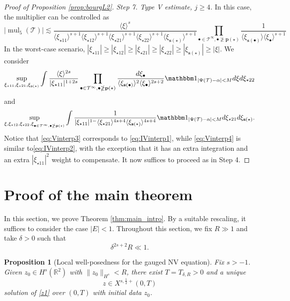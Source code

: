 \documentclass[a4paper,
11pt,  reqno]{amsart}
\newcommand{\jap}[1]{\langle #1 \rangle}
\newcommand{\5}{\textup{V}}
\newcommand{\noi}{\noindent}
\newcommand{\ind}{\mathbbm 1}
\newtheorem{proposition}[theorem]{Proposition}
\theoremstyle{remark}
\newcommand{\R}{\mathbb{R}}
\newcommand{\bul}{\bullet}
\newcommand{\TT}{\mathcal{T}}
\newcommand{\pb}{\mathbf{p}}
\newcommand{\sbf}{\mathbf{s}}
\DeclareMathOperator{\mul}{mul}
\numberwithin{equation}{section}
\numberwithin{theorem}{section}
\begin{document}
\begin{proof}[Proof of Proposition \ref{prop:bourgL2}]
\medskip
\noi\textit{Step 7. Type V estimate, $j\ge 4$.} In this case,  the multiplier can be controlled as
$$
|\mul_5(\TT)| \lesssim \frac{\jap{\xi}^s}{\jap{\xi_{\star11}}^{s+1}\jap{\xi_{\star12}}^{s+1}\jap{\xi_{\star21}}^{s+1}\jap{\xi_{\star22}}^{s+1}\jap{\xi_{\sbf(\star)}}^{s+1}} \prod_{\bul \in \TT^\infty, \bul\ngeq \pb(\star)} \frac{1}{\jap{\xi_{\sbf(\bul)}}\jap{\xi_\bul}^{s+1}}
$$
In the worst-case scenario, $|\xi_{\star11}|\ge|\xi_{\star12}|\ge|\xi_{\star21}|\ge|\xi_{\star22}|\ge|\xi_{\sbf(\star)}|\ge |\xi|$. We consider
\begin{equation}\label{eq:Vinterp3}
\sup_{\xi_{\star11}, \xi_{\star21}, \xi_{\sbf(\star)}} \int \frac{\jap{\xi}^{2s}}{|\xi_{\star11}|^{1+2s}}\prod_{\bul \in \TT^\infty, \bul\ngeq \pb(\star)} \frac{d\xi_\bul}{\jap{\xi_{\sbf(\bul)}}^2\jap{\xi_\bul}^{2s+2}}\ind_{|\Psi(\TT)-\alpha|<M}d\xi d\xi_{\star22}
\end{equation}
and
\begin{equation}\label{eq:Vinterp4}
\sup_{\xi, \xi_{\star12}, \xi_{\star22}, \xi_{\bul \in \TT^\infty, \bul\ngeq \pb(\star)}} \int \frac{1}{|\xi_{\star11}|^{1-}\jap{\xi_{\star21}}^{4s+4}\jap{\xi_{\sbf(\star)}}^{4s+4}} \ind_{|\Psi(\TT)-\alpha|<M} d\xi_{\star21}d\xi_{\sbf(\star)}.
\end{equation}
Notice that \eqref{eq:Vinterp3} corresponds to \eqref{eq:IVinterp1}, while \eqref{eq:Vinterp4} is similar to\eqref{eq:IVinterp2}, with the exception that it has an extra integration and an extra $|\xi_{\star11}|^2$ weight to compensate. It now suffices to proceed as in Step 4.
\end{proof}

\section{Proof of the main theorem}

In this section, we prove Theorem \ref{thm:main_intro}. By a suitable rescaling, it suffices to consider the case $|E|<1$. Throughout this section, we fix $R\gg 1$ and take $\delta>0$ such that
\begin{equation}\label{eq:escolhadelta}
\delta^{2s+2}R\ll 1.
\end{equation}

\begin{proposition}[Local well-posedness for the gauged NV equation]\label{prop:lwp_rnv}
Fix $s>-1$. Given $z_0\in H^s(\R^2)$ with $\|z_0\|_{H^s}<R$, there exist $T=T_{\delta,R}>0$ and a unique
$$
z\in X^{s,\frac12 +}(0,T)
$$
solution of \eqref{z1} over $(0,T)$ with initial data $z_0$.
\end{proposition}
\end{document}
